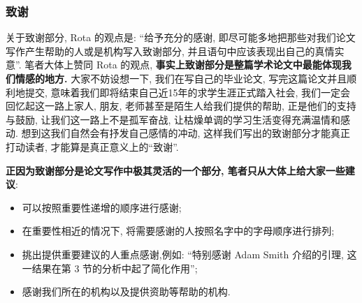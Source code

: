 \documentclass{formatBook}
\begin{document}
\subsubsection{致谢}
关于致谢部分, Rota 的观点是: ``给予充分的感谢, 即尽可能多地把那些对我们论文写作产生帮助的人或是机构写入致谢部分, 并且语句中应该表现出自己的真情实意''\cite{RotaTen1997}. 笔者大体上赞同 Rota 的观点, \textbf{事实上致谢部分是整篇学术论文中最能体现我们情感的地方. }大家不妨设想一下, 我们在写自己的毕业论文, 写完这篇论文并且顺利地提交, 意味着我们即将结束自己近15年的求学生涯正式踏入社会, 我们一定会回忆起这一路上家人, 朋友, 老师甚至是陌生人给我们提供的帮助, 正是他们的支持与鼓励, 让我们这一路上不是孤军奋战, 让枯燥单调的学习生活变得充满温情和感动. 想到这我们自然会有抒发自己感情的冲动, 这样我们写出的致谢部分才能真正打动读者, 才能算是真正意义上的``致谢''.
\par \textbf{正因为致谢部分是论文写作中极其灵活的一个部分, 笔者只从大体上给大家一些建议}:
\begin{itemize}
    \item 可以按照重要性递增的顺序进行感谢{;}
    \item 在重要性相近的情况下, 将需要感谢的人按照名字中的字母顺序进行排列{;}
    \item 挑出提供重要建议的人重点感谢,例如: ``特别感谢 Adam Smith 介绍的引理, 这一结果在第 3 节的分析中起了简化作用''{;}
    \item 感谢我们所在的机构以及提供资助等帮助的机构{.}
\end{itemize}
\end{document}
